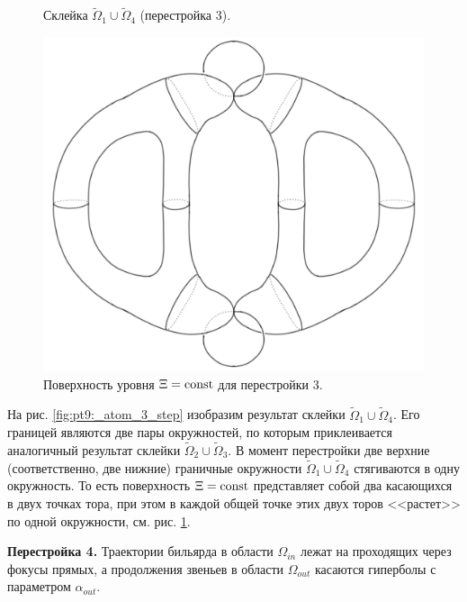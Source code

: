 \begin{figure}[!htb]
    \caption{Склейка $\widetilde{\Omega}_1 \cup \widetilde{\Omega}_4$ (перестройка 3).}
    \label{fig:pt9:_atom_3_step}
\endminipage\hfill
{}
\centering
\includegraphics[scale=0.2]{images/section2/atoms/atom_3.pdf}
    \caption{Поверхность уровня $\Xi = \mathrm{const}$ для перестройки 3.}
    \label{fig:pt9:_atom_3}
\endminipage\hfill
\end{figure}

На рис. \ref{fig:pt9:_atom_3_step} изобразим результат склейки $\widetilde{\Omega}_1 \cup \widetilde{\Omega}_4$. Его границей являются две пары окружностей, по которым приклеивается  аналогичный результат склейки $\widetilde{\Omega}_2 \cup \widetilde{\Omega}_3$.
В момент перестройки две верхние (соответственно, две нижние) граничные окружности  $\widetilde{\Omega}_1 \cup \widetilde{\Omega}_4$ стягиваются в одну окружность. То есть поверхность $\Xi = \mathrm{const}$ представляет собой два касающихся в двух точках тора, при этом в каждой общей точке этих двух торов <<растет>> по одной окружности, см.  рис. \ref{fig:pt9:_atom_3}. 

\textbf{Перестройка 4.} 
Траектории бильярда в области $\Omega_{in}$ лежат на проходящих через фокусы прямых, а продолжения звеньев в области $\Omega_{out}$ касаются гиперболы с параметром $\alpha_{out}$. 

